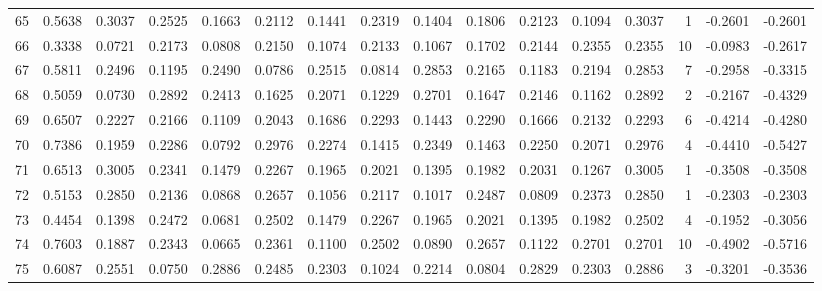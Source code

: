 \begin{tabular}{lrrrrrrrrrrrrrrr}
65  &      0.5638 &  0.3037 &  0.2525 &  0.1663 &  0.2112 &  0.1441 &  0.2319 &  0.1404 &  0.1806 &  0.2123 &   0.1094 &     0.3037 &      1 &                   -0.2601 &                    -0.2601 \\
66  &      0.3338 &  0.0721 &  0.2173 &  0.0808 &  0.2150 &  0.1074 &  0.2133 &  0.1067 &  0.1702 &  0.2144 &   0.2355 &     0.2355 &     10 &                   -0.0983 &                    -0.2617 \\
67  &      0.5811 &  0.2496 &  0.1195 &  0.2490 &  0.0786 &  0.2515 &  0.0814 &  0.2853 &  0.2165 &  0.1183 &   0.2194 &     0.2853 &      7 &                   -0.2958 &                    -0.3315 \\
68  &      0.5059 &  0.0730 &  0.2892 &  0.2413 &  0.1625 &  0.2071 &  0.1229 &  0.2701 &  0.1647 &  0.2146 &   0.1162 &     0.2892 &      2 &                   -0.2167 &                    -0.4329 \\
69  &      0.6507 &  0.2227 &  0.2166 &  0.1109 &  0.2043 &  0.1686 &  0.2293 &  0.1443 &  0.2290 &  0.1666 &   0.2132 &     0.2293 &      6 &                   -0.4214 &                    -0.4280 \\
70  &      0.7386 &  0.1959 &  0.2286 &  0.0792 &  0.2976 &  0.2274 &  0.1415 &  0.2349 &  0.1463 &  0.2250 &   0.2071 &     0.2976 &      4 &                   -0.4410 &                    -0.5427 \\
71  &      0.6513 &  0.3005 &  0.2341 &  0.1479 &  0.2267 &  0.1965 &  0.2021 &  0.1395 &  0.1982 &  0.2031 &   0.1267 &     0.3005 &      1 &                   -0.3508 &                    -0.3508 \\
72  &      0.5153 &  0.2850 &  0.2136 &  0.0868 &  0.2657 &  0.1056 &  0.2117 &  0.1017 &  0.2487 &  0.0809 &   0.2373 &     0.2850 &      1 &                   -0.2303 &                    -0.2303 \\
73  &      0.4454 &  0.1398 &  0.2472 &  0.0681 &  0.2502 &  0.1479 &  0.2267 &  0.1965 &  0.2021 &  0.1395 &   0.1982 &     0.2502 &      4 &                   -0.1952 &                    -0.3056 \\
74  &      0.7603 &  0.1887 &  0.2343 &  0.0665 &  0.2361 &  0.1100 &  0.2502 &  0.0890 &  0.2657 &  0.1122 &   0.2701 &     0.2701 &     10 &                   -0.4902 &                    -0.5716 \\
75  &      0.6087 &  0.2551 &  0.0750 &  0.2886 &  0.2485 &  0.2303 &  0.1024 &  0.2214 &  0.0804 &  0.2829 &   0.2303 &     0.2886 &      3 &                   -0.3201 &                    -0.3536 \\

\end{tabular}
